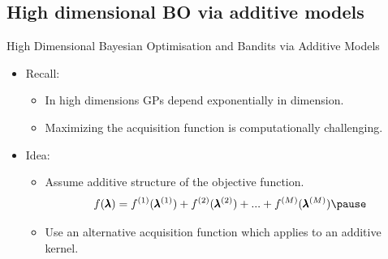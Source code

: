 \subsection{High dimensional BO via additive models}
\begin{frame}{High Dimensional Bayesian Optimisation and Bandits via Additive Models}
\vspace{2em}
\begin{itemize}
    \item Recall:
    \pause
    \begin{itemize}
        \item In high dimensions GPs depend exponentially in dimension.
        \pause
        \item Maximizing the acquisition function is computationally challenging.
        \pause
    \end{itemize}
    \item Idea:
    \pause
    \begin{itemize}
        \item Assume additive structure of the objective function. 
        \pause
        \begin{equation*}
            f(\conf)=f^{(1)}(\conf^{(1)})+f^{(2)}(\conf^{(2)})+...+f^{(M)}(\conf^{(M)})
            \pause
        \end{equation*}
        \item Use an alternative acquisition function which applies to an additive kernel.
    \end{itemize}
\end{itemize}

\end{frame}

